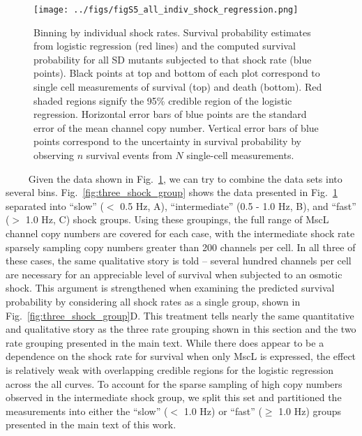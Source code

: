 \begin{figure}
\centering
\texttt{[image: ../figs/figS5\_all\_indiv\_shock\_regression.png]}
\caption{Binning
by
individual
shock
rates.
Survival
probability
estimates
from
logistic
regression
(red
lines)
and
the
computed
survival
probability
for
all SD
mutants
subjected
to
that
shock
rate
(blue
points).
Black
points
at top
and
bottom
of
each
plot
correspond
to
single
cell
measurements
of
survival
(top)
and
death
(bottom).
Red
shaded
regions
signify
the
95\%
credible
region
of the
logistic
regression.
Horizontal
error
bars
of
blue
points
are
the
standard
error
of the
mean
channel
copy
number.
Vertical
error
bars
of
blue
points
correspond
to the
uncertainty
in
survival
probability
by
observing
\(n\)
survival
events
from
\(N\)
single-cell
measurements.}\label{fig:indiv_shock_group}
\end{figure}

~~~~
Given
the
data
shown
in
Fig.~\ref{fig:indiv_shock_group},
we can
try to
combine
the
data
sets
into
several
bins.
Fig.~\ref{fig:three_shock_group}
shows
the
data
presented
in
Fig.~\ref{fig:indiv_shock_group}
separated
into
``slow''
(\(<\)
0.5
Hz,
A),
``intermediate''
(0.5 -
1.0
Hz,
B),
and
``fast''
(\(>\)
1.0
Hz, C)
shock
groups.
Using
these
groupings,
the
full
range
of
MscL
channel
copy
numbers
are
covered
for
each
case,
with
the
intermediate
shock
rate
sparsely
sampling
copy
numbers
greater
than
200
channels
per
cell.
In all
three
of
these
cases,
the
same
qualitative
story
is
told
--
several
hundred
channels
per
cell
are
necessary
for an
appreciable
level
of
survival
when
subjected
to an
osmotic
shock.
This
argument
is
strengthened
when
examining
the
predicted
survival
probability
by
considering
all
shock
rates
as a
single
group,
shown
in
Fig.~\ref{fig:three_shock_group}D.
This
treatment
tells
nearly
the
same
quantitative
and
qualitative
story
as the
three
rate
grouping
shown
in
this
section
and
the
two
rate
grouping
presented
in the
main
text.
While
there
does
appear
to be
a
dependence
on the
shock
rate
for
survival
when
only
MscL
is
expressed,
the
effect
is
relatively
weak
with
overlapping
credible
regions
for
the
logistic
regression
across
the
all
curves.
To
account
for
the
sparse
sampling
of
high
copy
numbers
observed
in the
intermediate
shock
group,
we
split
this
set
and
partitioned
the
measurements
into
either
the
``slow''
(\(<\)
1.0
Hz) or
``fast''
(\(\geq\)
1.0
Hz)
groups
presented
in the
main
text
of
this
work.

